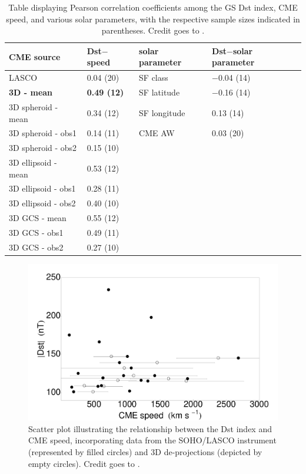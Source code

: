 \begin{table}[!htp] 
	\small
	\centering
	\caption{Table displaying Pearson correlation coefficients among the GS Dst index, CME speed, and various solar parameters, with the respective sample sizes indicated in parentheses. Credit goes to \citet{miteva_2023}.}
	\label{tab_cc_CME}
	\begin{tabular}{llll}
		\toprule
		\textbf{CME source}	& \textbf{Dst$-$speed} & \textbf{solar parameter} & \textbf{Dst$-$solar parameter}	\\
		\midrule
		LASCO              & 0.04 (20) & SF class      & $-$0.04 (14) \\
		{\bf 3D - mean}    & {\bf 0.49 (12)} & SF latitude   & $-$0.16 (14)   \\
		3D spheroid - mean & 0.34 (12) & SF longitude  & 0.13 (14)	\\
		3D spheroid - obs1 & 0.14 (11) & CME AW        & 0.03 (20) \\
		3D spheroid - obs2 & 0.15 (10) & \\ 
		3D ellipsoid - mean & 0.53 (12) & &	\\
		3D ellipsoid - obs1 & 0.28 (11) & & \\
		3D ellipsoid - obs2 & 0.40 (10) & &\\
		3D GCS - mean & 0.55 (12) & &\\
		3D GCS - obs1 & 0.49 (11) & &\\
		3D GCS - obs2 & 0.27 (10) & & \\
		\bottomrule
	\end{tabular}
\end{table}

\begin{figure}[!htp]
	\centering
	\includegraphics[width=0.7\hsize]{chapter2/figs/Fig_GS_speed_er_mean.pdf}
	\caption{Scatter plot illustrating the relationship between the Dst index and CME speed, incorporating data from the SOHO/LASCO instrument (represented by filled circles) and 3D de-projections (depicted by empty circles). Credit goes to \citet{miteva_2023}.}
	\label{fig_speeds_dst}
\end{figure}

